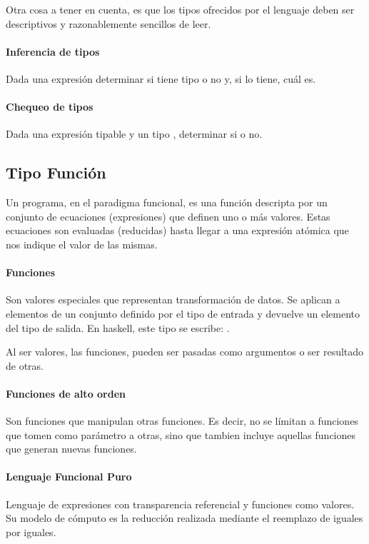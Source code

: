 Otra cosa a tener en cuenta, es que los tipos ofrecidos por el lenguaje deben ser descriptivos y razonablemente sencillos de leer.

\paragraph{Inferencia de tipos} Dada una expresión  determinar si tiene tipo o no y, si lo tiene, cuál es.

\paragraph{Chequeo de tipos} Dada una expresión tipable  y un tipo , determinar si  o no.

\subsection{Tipo Función}
Un programa, en el paradigma funcional, es una función descripta por un conjunto de ecuaciones (expresiones) que definen uno o más valores. Estas ecuaciones son evaluadas (reducidas) hasta llegar a una expresión atómica que nos indique el valor de las mismas.

\paragraph{Funciones} Son valores especiales que representan transformación de datos. Se aplican a elementos de un conjunto definido por el tipo de entrada y devuelve un elemento del tipo de salida. En haskell, este tipo se escribe:  .

Al ser valores, las funciones, pueden ser pasadas como argumentos o ser resultado de otras.

\paragraph{Funciones de alto orden} Son funciones que manipulan otras funciones. Es decir, no se límitan a funciones que tomen como parámetro a otras, sino que tambien incluye aquellas funciones que generan nuevas funciones.

\paragraph{Lenguaje Funcional Puro} Lenguaje de expresiones con transparencia referencial y funciones como valores. Su modelo de cómputo es la reducción realizada mediante el reemplazo de iguales por iguales.

